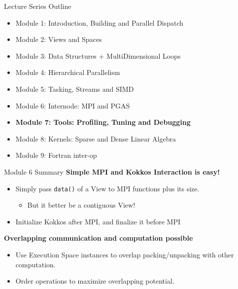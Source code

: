 \begin{frame}[fragile]{Lecture Series Outline}

\begin{itemize}
        \item Module 1: Introduction, Building and Parallel Dispatch
        \item Module 2: Views and Spaces
        \item Module 3: Data Structures + MultiDimensional Loops
        \item Module 4: Hierarchical Parallelism
        \item Module 5: Tasking, Streams and SIMD
        \item Module 6: Internode: MPI and PGAS
        \item \textbf{Module 7: Tools: Profiling, Tuning and Debugging}
        \item Module 8: Kernels: Sparse and Dense Linear Algebra
        \item Module 9: Fortran inter-op
\end{itemize}

\end{frame}

\begin{frame}{Module 6 Summary}
\textbf{Simple MPI and Kokkos Interaction is easy!}
\begin{itemize}
  \item Simply pass \texttt{data()} of a View to MPI functions plus its size.
  \begin{itemize}
    \item But it better be a contiguous View!
  \end{itemize}
  \item Initialize Kokkos after MPI, and finalize it before MPI
\end{itemize}

\vspace{10pt}
\textbf{Overlapping communication and computation possible}
\begin{itemize}
  \item Use Execution Space instances to overlap packing/unpacking with other computation.
  \item Order operations to maximize overlapping potential. 
\end{itemize}
\end{frame}

